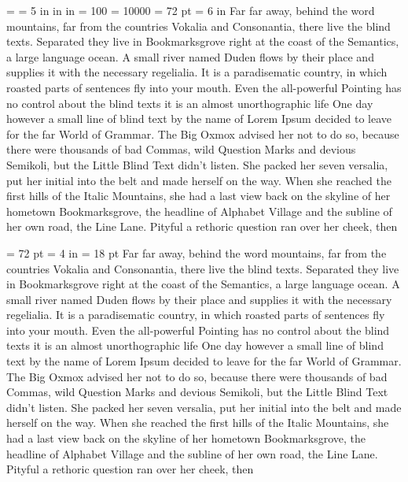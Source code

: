 \magnification = 
\hsize = 5 in 
 in
 in
\tolerance = 100
\hbadness = 10000
\footline{\hfil --\the\pageno-- \hfil}
\parindent = 72 pt
\hsize = 6 in
 Far far away, behind the word mountains, far from the countries Vokalia and Consonantia, 
there live the blind texts. Separated they live in Bookmarksgrove right at the coast of 
the Semantics, a large language ocean. A small river named Duden flows by their place and 
supplies it with the necessary regelialia. It is a paradisematic country, in which roasted 
parts of sentences fly into your mouth. Even the all-powerful Pointing has no control about 
the blind texts it is an almost unorthographic life One day however a small line of blind text 
by the name of Lorem Ipsum decided to leave for the far World of Grammar. The Big Oxmox advised 
her not to do so, because there were thousands of bad Commas, wild Question Marks and devious Semikoli,
but the Little Blind Text didn’t listen. She packed her seven versalia, put her initial into the belt 
and made herself on the way. When she reached the first hills of the Italic Mountains, she had a 
last view back on the skyline of her hometown Bookmarksgrove, the headline of Alphabet Village and 
the subline of her own road, the Line Lane. Pityful a rethoric question ran over her cheek, then 
 
\parindent = 72 pt
\hsize = 4 in
\baselineskip = 18 pt
 Far far away, behind the word mountains, far from the countries Vokalia and Consonantia, 
there live the blind texts. Separated they live in Bookmarksgrove right at the coast of 
the Semantics, a large language ocean. A small river named Duden flows by their place and 
supplies it with the necessary regelialia. It is a paradisematic country, in which roasted 
parts of sentences fly into your mouth. Even the all-powerful Pointing has no control about 
the blind texts it is an almost unorthographic life One day however a small line of blind text 
by the name of Lorem Ipsum decided to leave for the far World of Grammar. The Big Oxmox advised 
her not to do so, because there were thousands of bad Commas, wild Question Marks and devious Semikoli,
but the Little Blind Text didn’t listen. She packed her seven versalia, put her initial into the belt 
and made herself on the way. When she reached the first hills of the Italic Mountains, she had a 
last view back on the skyline of her hometown Bookmarksgrove, the headline of Alphabet Village and 
the subline of her own road, the Line Lane. Pityful a rethoric question ran over her cheek, then 

